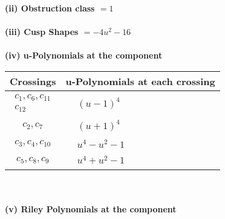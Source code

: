 \documentclass[1p]{elsarticle_modified}
\theoremstyle{definition}
\begin{document}
\flushleft \textbf{(ii) Obstruction class $= 1$}\\~\\
\flushleft \textbf{(iii) Cusp Shapes $= -4 u^2-16$}\\~\\
\newpage\renewcommand{\arraystretch}{1}
\flushleft \textbf{(iv) u-Polynomials at the component}\newline \\
\begin{tabular}{m{50pt}|m{274pt}}
Crossings & \hspace{64pt}u-Polynomials at each crossing \\
\hline $$\begin{aligned}c_{1},c_{6},c_{11}\\c_{12}\end{aligned}$$&$\begin{aligned}
&(u-1)^4
\end{aligned}$\\
\hline $$\begin{aligned}c_{2},c_{7}\end{aligned}$$&$\begin{aligned}
&(u+1)^4
\end{aligned}$\\
\hline $$\begin{aligned}c_{3},c_{4},c_{10}\end{aligned}$$&$\begin{aligned}
&u^4- u^2-1
\end{aligned}$\\
\hline $$\begin{aligned}c_{5},c_{8},c_{9}\end{aligned}$$&$\begin{aligned}
&u^4+u^2-1
\end{aligned}$\\
\hline
\end{tabular}\\~\\
\newpage\renewcommand{\arraystretch}{1}
\flushleft \textbf{(v) Riley Polynomials at the component}\newline \\
\end{document}
